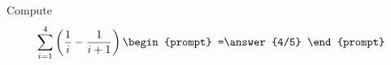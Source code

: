 \documentclass{ximera}
\author{Gregory Hartman \and Matthew Carr}
\begin{document}
\begin{exercise}

Compute
\[
\sum_{i=1}^{4}\left(\frac{1}{i}-\frac{1}{i+1}\right)\begin{prompt}
=\answer{4/5}
\end{prompt}
\]

\end{exercise}
\end{document}
